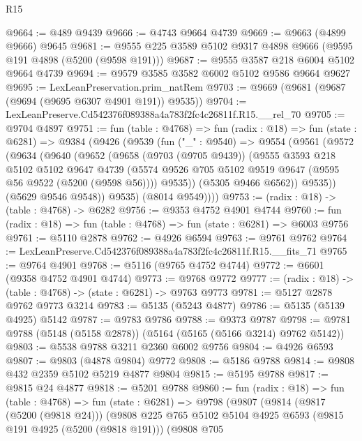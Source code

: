 \begin{lexlean}{R15}
\begin{coremodule}
{{{{{{{{{{{@9664 := @489 @9439
@9666 := @4743 @9664 @4739
@9669 := @9663 (@4899 @9666) @9645
@9681 := @9555 @225 @3589 @5102 @9317 @4898 @9666 (@9595 @191 @4898 (@5200 (@9598 @191)))
@9687 := @9555 @3587 @218 @6004 @5102 @9664 @4739
@9694 := @9579 @3585 @3582 @6002 @5102 @9586 @9664 @9627
@9695 := LexLeanPreservation.prim_natRem
@9703 := @9669 (@9681 (@9687 (@9694 (@9695 @6307 @4901 @191)) @9535))
@9704 := LexLeanPreserve.Cd542376f089388a4a783f2fc4c26811f.R15.__rel_70
@9705 := @9704 @4897
@9751 := fun (table : @4768) =>
  fun (radix : @18) =>
  fun (state : @6281) =>
  @9384
    (@9426
      (@9539
        (fun ("_" : @9540) =>
        @9554
          (@9561
            (@9572
              (@9634
                (@9640
                  (@9652
                    (@9658
                      (@9703 (@9705 @9439))
                      (@9555
                        @3593
                        @218
                        @5102
                        @5102
                        @9647
                        @4739
                        (@5574 @9526 @705 @5102 @9519 @9647 (@9595 @56 @9522 (@5200 (@9598 @56))))
                        @9535))
                    (@5305 @9466 @6562))
                  @9535))
              (@5629 @9546 @9548))
            @9535)
          (@8014 @9549))))
@9753 := (radix : @18) -> (table : @4768) -> @6282
@9756 := @9353 @4752 @4901 @4744
@9760 := fun (radix : @18) => fun (table : @4768) => fun (state : @6281) => @6003 @9756
@9761 := @5110 @2878
@9762 := @4926 @6594
@9763 := @9761 @9762
@9764 := LexLeanPreserve.Cd542376f089388a4a783f2fc4c26811f.R15.__fits_71
@9765 := @9764 @4901
@9768 := @5116 (@9765 @4752 @4744)
@9772 := @6601 (@9358 @4752 @4901 @4744)
@9773 := @9768 @9772
@9777 := (radix : @18) -> (table : @4768) -> (state : @6281) -> @9763 @9773
@9781 := @5127 @2878 @9762 @9773 @3214
@9783 := @5135 (@5243 @4877)
@9786 := @5135 (@5139 @4925) @5142
@9787 := @9783 @9786
@9788 := @9373 @9787
@9798 := @9781 @9788 (@5148 (@5158 @2878)) (@5164 (@5165 (@5166 @3214) @9762 @5142))
@9803 := @5538 @9788 @3211 @2360 @6002 @9756
@9804 := @4926 @6593
@9807 := @9803 (@4878 @9804) @9772
@9808 := @5186 @9788
@9814 := @9808 @432 @2359 @5102 @5219 @4877 @9804
@9815 := @5195 @9788
@9817 := @9815 @24 @4877
@9818 := @5201 @9788
@9860 := fun (radix : @18) =>
  fun (table : @4768) =>
  fun (state : @6281) =>
  @9798
    (@9807
      (@9814
        (@9817 (@5200 (@9818 @24)))
        (@9808
          @225
          @765
          @5102
          @5104
          @4925
          @6593
          (@9815 @191 @4925 (@5200 (@9818 @191)))
          (@9808
            @705
}}}}}}}}}}}
\end{coremodule}
\end{lexlean}
